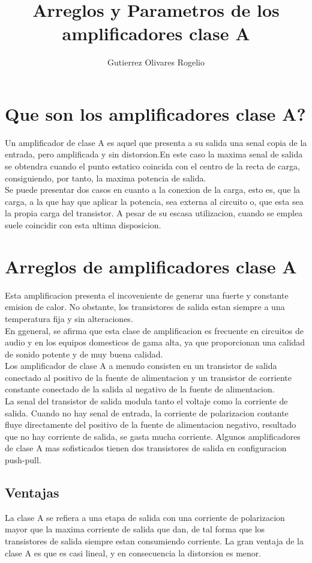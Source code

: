 \documentclass[12pt,a4paper]{report}
\author{Gutierrez Olivares Rogelio}
\title{Arreglos y Parametros de los amplificadores clase A}
\begin{document}
\maketitle
\chapter{Que son los amplificadores clase A?}
Un amplificador de clase A es aquel que presenta a su salida una senal copia de la entrada, pero amplificada y sin distorsion.En este caso la maxima senal de salida se obtendra cuando el punto estatico coincida con el centro de la recta de carga, consiguiendo, por tanto, la maxima potencia de salida.\\
Se puede presentar dos casos en cuanto a la conexion de la carga, esto es, que la carga, a la que hay que aplicar la potencia, sea externa al circuito o, que esta sea la propia carga del transistor. A pesar de su escasa utilizacion, cuando se emplea suele coincidir con esta ultima disposicion.
\chapter{Arreglos de amplificadores clase A}
Esta amplificacion presenta el incoveniente de generar una fuerte y constante emision de calor. No obstante, los transistores de salida estan siempre a una temperatura fija y sin alteraciones.\\
En ggeneral, se afirma que esta clase de amplificacion es frecuente en circuitos de audio y en los equipos domesticos de gama alta, ya que proporcionan una calidad de sonido potente y de muy buena calidad.\\
Los amplificador de clase A a menudo consisten en un transistor de salida conectado al positivo de la fuente de alimentacion y un transistor de corriente constante conectado de la salida al negativo de la fuente de alimentacion.\\
La senal del transistor de salida modula tanto el voltaje como la corriente de salida. Cuando no hay senal de entrada, la corriente de polarizacion contante fluye directamente del positivo de la fuente de alimentacion negativo, resultado que no hay corriente de salida, se gasta mucha corriente. Algunos amplificadores de clase A mas sofisticados tienen dos transistores de salida en configuracion push-pull.
\section{Ventajas}
La clase A se refiera a una etapa de salida con una corriente de polarizacion mayor que la maxima corriente de salida que dan, de tal forma que los transistores de salida siempre estan consumiendo corriente. La gran ventaja de la clase A es que es casi lineal, y en consecuencia la distorsion es menor.
\end{document}
